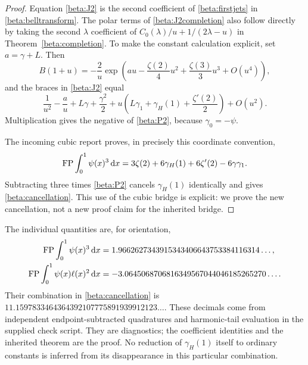 \begin{proof}
Equation \eqref{beta:J2} is the second coefficient of
\eqref{beta:firstjets} in \eqref{beta:belltransform}.
The polar terms of \eqref{beta:J2completion} also follow directly
by taking the second $\lambda$ coefficient of
$C_0(\lambda)/u+1/(2\lambda-u)$ in
Theorem~\ref{beta:completion}. To make the constant calculation
explicit, set $a=\gamma+L$. Then
\[
 B(1+u)=-\frac2u
 \exp\left(au-\frac{\zeta(2)}4u^2+\frac{\zeta(3)}3u^3+O(u^4)\right),
\]
and the braces in \eqref{beta:J2} equal
\[
 \frac1{u^2}-\frac a u+L\gamma+\frac{\gamma^2}2
  +u\left(L\gamma_1+\gamma_H(1)+\frac{\zeta'(2)}2\right)+O(u^2).
\]
Multiplication gives the negative of \eqref{beta:P2}, because
$\gamma_0=-\psi$.

The incoming cubic report \cite{RepoCubic} proves, in precisely this
coordinate convention,
\begin{equation}\label{beta:inheritedcube}
 \operatorname{FP}\int_0^1\psi(x)^3\,\mathrm d x
 =3\zeta(2)+6\gamma_H(1)+6\zeta'(2)-6\gamma\gamma_1.
\end{equation}
Subtracting three times \eqref{beta:P2} cancels $\gamma_H(1)$
identically and gives \eqref{beta:cancellation}. This use of the cubic
bridge is explicit: we prove the new cancellation, not a new proof
claim for the inherited bridge.
\end{proof}

The individual quantities are, for orientation,
\begin{align*}
 \operatorname{FP}\int_0^1\psi(x)^3\,\mathrm d x
   &=1.9662627343915343406643753384116314\ldots,\\
 \operatorname{FP}\int_0^1\psi(x)\ell(x)^2\,\mathrm d x
   &=-3.0645068706816349567044046185265270\ldots.
\end{align*}
Their combination in \eqref{beta:cancellation} is
$11.1597833464364392107775891939912123\ldots$.
These decimals come from independent endpoint-subtracted quadratures
and harmonic-tail evaluation in the supplied check script. They are
diagnostics; the coefficient identities and the inherited theorem are
the proof. No reduction of $\gamma_H(1)$ itself to ordinary constants
is inferred from its disappearance in this particular combination.
